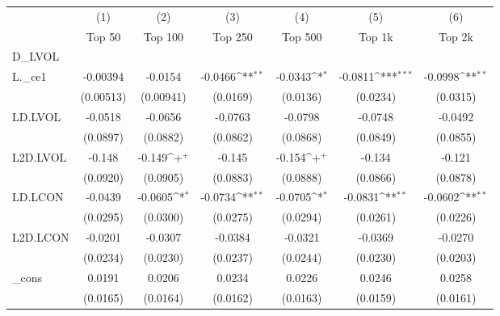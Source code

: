 {
\def\sym#1{\ifmmode^{#1}\else\(^{#1}\)\fi}
\begin{tabular}{l*{6}{c}}
\hline\hline
          &\multicolumn{1}{c}{(1)}&\multicolumn{1}{c}{(2)}&\multicolumn{1}{c}{(3)}&\multicolumn{1}{c}{(4)}&\multicolumn{1}{c}{(5)}&\multicolumn{1}{c}{(6)}\\
          &\multicolumn{1}{c}{Top 50}&\multicolumn{1}{c}{Top 100}&\multicolumn{1}{c}{Top 250}&\multicolumn{1}{c}{Top 500}&\multicolumn{1}{c}{Top 1k}&\multicolumn{1}{c}{Top 2k}\\
\hline
D\_LVOL    &                  &                  &                  &                  &                  &                  \\
L.\_ce1    & -0.00394         &  -0.0154         &  -0.0466\sym{**} &  -0.0343\sym{*}  &  -0.0811\sym{***}&  -0.0998\sym{**} \\
          &(0.00513)         &(0.00941)         & (0.0169)         & (0.0136)         & (0.0234)         & (0.0315)         \\
LD.LVOL   &  -0.0518         &  -0.0656         &  -0.0763         &  -0.0798         &  -0.0748         &  -0.0492         \\
          & (0.0897)         & (0.0882)         & (0.0862)         & (0.0868)         & (0.0849)         & (0.0855)         \\
L2D.LVOL  &   -0.148         &   -0.149\sym{+}  &   -0.145         &   -0.154\sym{+}  &   -0.134         &   -0.121         \\
          & (0.0920)         & (0.0905)         & (0.0883)         & (0.0888)         & (0.0866)         & (0.0878)         \\
LD.LCON   &  -0.0439         &  -0.0605\sym{*}  &  -0.0734\sym{**} &  -0.0705\sym{*}  &  -0.0831\sym{**} &  -0.0602\sym{**} \\
          & (0.0295)         & (0.0300)         & (0.0275)         & (0.0294)         & (0.0261)         & (0.0226)         \\
L2D.LCON  &  -0.0201         &  -0.0307         &  -0.0384         &  -0.0321         &  -0.0369         &  -0.0270         \\
          & (0.0234)         & (0.0230)         & (0.0237)         & (0.0244)         & (0.0230)         & (0.0203)         \\
\_cons    &   0.0191         &   0.0206         &   0.0234         &   0.0226         &   0.0246         &   0.0258         \\
          & (0.0165)         & (0.0164)         & (0.0162)         & (0.0163)         & (0.0159)         & (0.0161)         \\

\end{tabular}}
